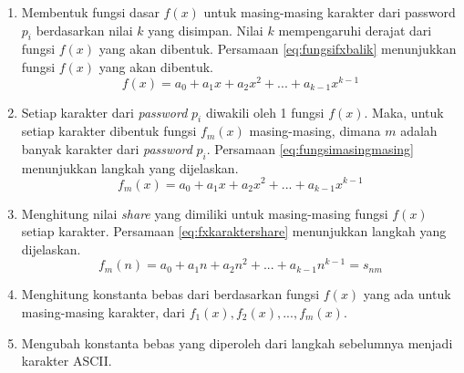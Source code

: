 \begin{enumerate}
	\item Membentuk fungsi dasar \begin{math}f(x)\end{math} untuk masing-masing karakter dari password \begin{math}p_i\end{math} berdasarkan nilai \begin{math}k\end{math} yang disimpan. Nilai \begin{math}k\end{math} mempengaruhi derajat dari fungsi \begin{math}f(x)\end{math} yang akan dibentuk. Persamaan \ref{eq:fungsifxbalik} menunjukkan fungsi \begin{math}f(x)\end{math} yang akan dibentuk.
	\begin{equation}
		f(x) = a_0 + a_1x + a_2x^2 + ... + a_{k-1}x^{k-1} \label{eq:fungsifxbalik}
	\end{equation}
	\item Setiap karakter dari \textit{password} \begin{math}p_i\end{math} diwakili oleh 1 fungsi \begin{math}f(x)\end{math}. Maka, untuk setiap karakter dibentuk fungsi \begin{math}f_m(x)\end{math} masing-masing, dimana \begin{math}m\end{math} adalah banyak karakter dari \textit{password} \begin{math}p_i\end{math}. Persamaan \ref{eq:fungsimasingmasing} menunjukkan langkah yang dijelaskan.
	\begin{equation}
		f_m(x) = a_0 + a_1x + a_2x^2 + ... + a_{k-1}x^{k-1} \label{eq:fungsimasingmasing}
	\end{equation}
	\item Menghitung nilai \textit{share} yang dimiliki untuk masing-masing fungsi \begin{math}f(x)\end{math} setiap karakter. Persamaan \ref{eq:fxkaraktershare} menunjukkan langkah yang dijelaskan.
	\begin{equation}
		f_m(n) = a_0 + a_1n + a_2n^2 + ... + a_{k-1}n^{k-1} = s_{nm} \label{eq:fxkaraktershare}
	\end{equation}
	\item Menghitung konstanta bebas dari berdasarkan fungsi \begin{math}f(x)\end{math} yang ada untuk masing-masing karakter, dari \begin{math}f_1(x), f_2(x), ..., f_m(x)\end{math}.
	\item Mengubah konstanta bebas yang diperoleh dari langkah sebelumnya menjadi karakter ASCII.
\end{enumerate}

